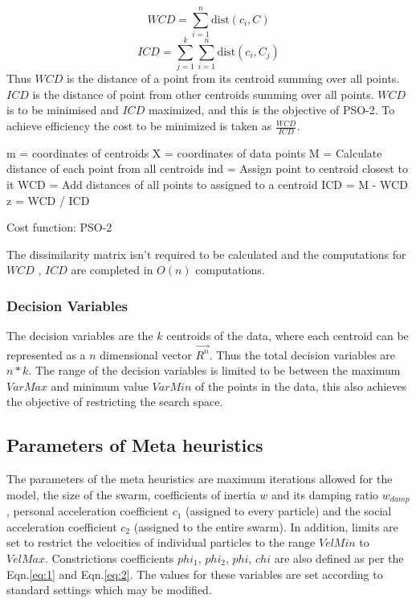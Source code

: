 \documentclass[conference]{IEEEtran}
\begin{document}
\begin{equation}
WCD = \sum_{i = 1}^{n} \text{dist}(c_i , C)
\end{equation}
\begin{equation}
ICD = \sum_{j = 1}^{k} \sum_{i = 1}^{n}\text{dist}(c_i , C_j)
\end{equation}
Thus $WCD$ is the distance of a point from its centroid summing over all points. $ICD$ is the distance of point from other centroids summing over all points. $WCD$ is to be minimised and $ICD$ maximized, and this is the objective of PSO-2. To achieve efficiency the cost to be minimized is taken as $\frac{WCD}{ICD}$.\\


\begin{algorithm}
\SetAlgoLined
{}
 m = coordinates of centroids\;
 X = coordinates of data points\;
 M = Calculate distance of each point from all centroids\;
 ind = Assign point to centroid closest to it\;
 WCD = Add distances of all points to assigned to a centroid\;
 ICD = M - WCD\;
 z = WCD / ICD\;
 \caption{Cost function: PSO-2}
\end{algorithm}

The dissimilarity matrix isn't required to be calculated and the computations for $WCD$ , $ICD$ are completed in $O(n)$ computations.\\



\subsubsection{Decision Variables} 
The decision variables are the $k$ centroids of the data, where each centroid can be represented as a $n$ dimensional vector $\overrightarrow{R^n}$. Thus the total decision variables are $n * k$. The range of the decision variables is limited to be between the maximum $VarMax$ and minimum value $VarMin$ of the points in the data, this also achieves the objective of restricting the search space. 

\subsection{Parameters of Meta heuristics}
The parameters of the meta heuristics are maximum iterations allowed for the model, the size of the swarm, coefficients of inertia $w$ and its damping ratio $w_{damp}$ , personal acceleration coefficient $c_1$ (assigned to every particle) and the social acceleration coefficient $c_2$ (assigned to the entire swarm). In addition, limits are set to restrict the velocities of individual particles to the range $VelMin$ to $VelMax$. Constrictions coefficients $phi_1$, $phi_2$, $phi$, $chi$ are also defined as per the Eqn.\ref{eq:1} and Eqn.\ref{eq:2}. The values for these variables are set according to standard settings which may be modified. 
\end{document}
